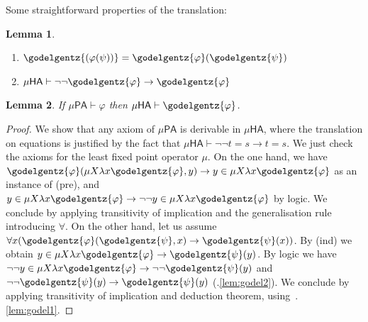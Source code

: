 \documentclass[10pt,a4paper]{amsart}
\theoremstyle{plain}
\newtheorem{lemma}[lemma]{Lemma}
\theoremstyle{definition}
\renewcommand{\phi}{\varphi}
\theoremstyle{plain}
\theoremstyle{definition} %
\newcommand{\limp}{\to}
\newcommand{\mufo}[3]{\mu #1 \lambda #2 #3}
\newcommand{\PA}{\mathsf{PA}}
\newcommand{\HA}{\mathsf{HA}}
\newcommand{\muPA}{\mu\PA}
\newcommand{\muHA}{\mu\HA}
\begin{document}
Some straightforward properties of the translation:

\begin{lemma}{\ }\label{lem:godel}
\begin{enumerate}
 \item \label{lem:godel1}$\godelgentz{(\phi(\psi))}= \godelgentz{\phi}(\godelgentz{\psi})$
    \item\label{lem:godel2} $\muHA \vdash \neg \neg \godelgentz {\phi} \to \godelgentz {\phi}$
\end{enumerate}
\end{lemma}

\begin{lemma}\label{lem:muPA-in-muHA}
    If $\muPA \vdash \phi$ then $\muHA \vdash \godelgentz{\phi}$.
\end{lemma}
\begin{proof}
We show that any axiom of $\muPA$ is derivable in $\muHA$, where the translation on equations is justified by the fact that $\muHA \vdash \neg \neg t=s \to t=s$. We just check the axioms for  the least fixed point operator $\mu$.  On the one hand, we have $ \godelgentz{\phi}(\mufo X x \godelgentz{\phi}, y) \limp y \in \mufo X x \godelgentz{\phi}$ as an instance of (pre),  and $y \in \mufo X x \godelgentz{\phi} \to \neg \neg y \in \mufo X x \godelgentz{\phi}$ by logic. We conclude by applying transitivity of implication and the generalisation rule introducing $\forall$. On the other hand, let us assume $\forall x(\godelgentz{\phi}(\godelgentz{\psi}, x) \limp \godelgentz{\psi}(x))$. By (ind) we obtain $y \in \mufo X x \godelgentz{\phi}  \limp \godelgentz{\psi}(y)$. By logic we have 
 $\neg \neg y \in \mufo X x \godelgentz{\phi}  \limp \neg \neg \godelgentz{\psi}(y)$ and $ \neg \neg \godelgentz{\psi}(y)\to \godelgentz{\psi}(y) $ (.\ref{lem:godel2}). We conclude by applying transitivity of implication and deduction theorem, using~.\ref{lem:godel1}. 
\end{proof}
\end{document}
